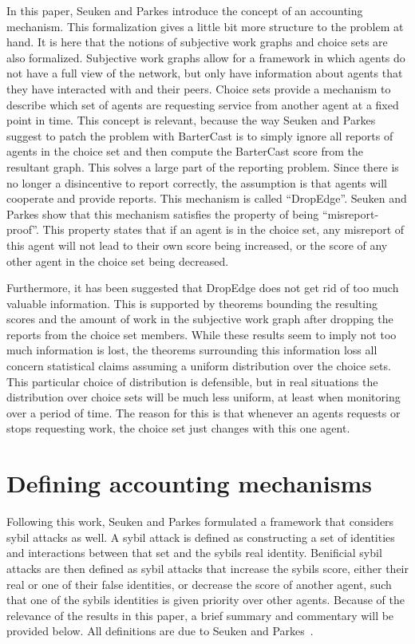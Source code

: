\documentclass[a4paper,11pt]{book}
\theoremstyle{definition}
\begin{document}
In this paper, Seuken and Parkes introduce the concept of an accounting mechanism. This formalization gives
a little bit more structure to the problem at hand. It is here that the notions of subjective work graphs
and choice sets are also formalized. Subjective work graphs allow for a framework in which agents
do not have a full view of the network, but only have information about agents that they have interacted
with and their peers. Choice sets provide a mechanism to describe which set of agents are requesting
service from another agent at a fixed point in time. 
This concept is relevant, because the way
Seuken and Parkes suggest to patch the problem with BarterCast is to simply ignore all reports of agents
in the choice set and then compute the BarterCast score from the resultant graph.
This solves a large part of the reporting problem. Since there is no longer a disincentive
to report correctly, the assumption is that agents will cooperate and provide reports.
This mechanism is called ``DropEdge''. Seuken and Parkes show that this mechanism satisfies the property
of being ``misreport-proof''. This property states that if an agent is in the choice set, 
any misreport of this agent will not lead to their own score being increased, or the score of
any other agent in the choice set being decreased.

Furthermore, it has been suggested that DropEdge does not get rid of too much valuable information.
This is supported by theorems bounding the resulting scores and the amount of work in the subjective
work graph after dropping the reports from the choice set members. While these results seem to imply
not too much information is lost, the theorems surrounding this information loss all concern statistical
claims assuming a uniform distribution over the choice sets. This particular choice of distribution is
defensible, but in real situations the distribution over choice sets will be much less uniform, at least
when monitoring over a period of time. The reason for this is that whenever an agents requests or
stops requesting work, the choice set just changes with this one agent.

\section{Defining accounting mechanisms}

Following this work, Seuken and Parkes \cite{seuken2014sybil} formulated a framework that considers sybil attacks as well. 
A sybil attack is defined as constructing a set of identities and interactions between that set and the sybils real identity.
Benificial sybil attacks are then defined as sybil attacks that increase the sybils score, either their real or one of
their false identities, or decrease the score of another  agent, such that one of the sybils identities
is given priority over other agents. Because of the relevance of the results in this paper, a brief summary
and commentary will be provided below. All definitions are due to Seuken and Parkes~\cite{seuken2014sybil}.
\end{document}
